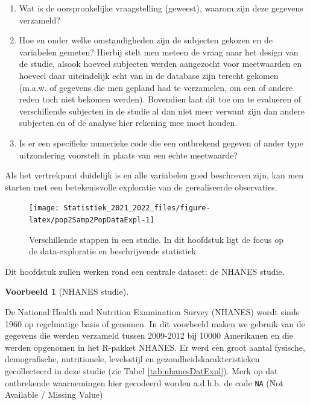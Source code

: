 \documentclass[
  12pt,dutch,coursenotes]{book}
\newcommand{\passthrough}[1]{#1}
\providecommand{\tightlist}{%
  \setlength{\itemsep}{0pt}\setlength{\parskip}{0pt}}
\theoremstyle{definition}
\theoremstyle{definition}
\newtheorem{example}{Voorbeeld}[chapter]
\theoremstyle{definition}
\theoremstyle{definition}
\theoremstyle{remark}
\begin{document}
\begin{enumerate}
\def\labelenumi{\arabic{enumi}.}
\tightlist
\item
  Wat is de oorspronkelijke vraagstelling (geweest), waarom zijn deze
  gegevens verzameld?
\item
  Hoe en onder welke omstandigheden zijn de subjecten gekozen en de variabelen gemeten? Hierbij stelt men meteen de vraag naar het design van de studie, alsook hoeveel subjecten werden aangezocht voor meetwaarden en hoeveel daar uiteindelijk echt van in de database zijn terecht gekomen (m.a.w. of gegevens die men gepland had te verzamelen, om een of andere reden toch niet bekomen werden). Bovendien laat dit toe om te evalueren of verschillende subjecten in de studie al dan niet meer verwant zijn dan andere subjecten en of de analyse hier rekening mee moet houden.
\item
  Is er een specifieke numerieke code die een ontbrekend gegeven of
  ander type uitzondering voorstelt in plaats van een echte meetwaarde?
\end{enumerate}

Als het vertrekpunt duidelijk is en alle variabelen goed beschreven zijn,
kan men starten met een betekenisvolle exploratie van de gerealiseerde
observaties.

\begin{figure}

{\centering \texttt{[image: Statistiek\_2021\_2022\_files/figure-latex/pop2Samp2PopDataExpl-1]} 

}

\caption{Verschillende stappen in een studie. In dit hoofdstuk ligt de focus op de data-exploratie en beschrijvende statistiek}\label{fig:pop2Samp2PopDataExpl}
\end{figure}

Dit hoofdstuk zullen werken rond een centrale dataset: de NHANES studie.

\begin{example}[NHANES studie]
\protect\hypertarget{exm:nhanesEx}{}{\label{exm:nhanesEx} {} }
\end{example}

De National Health and Nutrition Examination Survey
(NHANES) wordt sinds 1960 op regelmatige basis of genomen. In dit voorbeeld maken we gebruik van de gegevens die werden verzameld tussen 2009-2012 bij 10000 Amerikanen en die werden opgenomen in het R-pakket NHANES. Er werd een groot aantal fysische, demografische, nutritionele, levelsstijl en gezondheidskarakteristieken gecollecteerd in deze studie (zie Tabel \ref{tab:nhanesDatExpl}). Merk op dat ontbrekende waarnemingen hier gecodeerd worden a.d.h.b. de code \passthrough{\lstinline!NA!} (Not Available / Missing Value)
\end{document}
